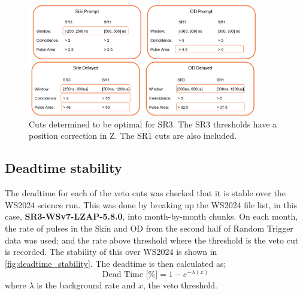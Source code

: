 \begin{figure}
	\centering
	\includegraphics[width=0.9\textwidth]{figures/VetoEfficiency/sr3_cuts.png}
	\caption{Cuts determined to be optimal for SR3.
		The SR3 thresholds have a position correction in Z. The SR1 cuts are also included.}
	\label{fig:sr3_veto_cuts}
\end{figure}

\subsection{Deadtime stability}
The deadtime for each of the veto cuts was checked that it is stable over the WS2024 science run.
This was done by breaking up the WS2024 file list, in this case, \textbf{SR3-WSv7-LZAP-5.8.0}, into month-by-month chunks.
On each month, the rate of pulses in the Skin and OD from the second half of Random Trigger data was used; and the rate above threshold where the threshold is the veto cut is recorded. 
The stability of this over WS2024 is shown in \autoref{fig:deadtime_stability}.
The deadtime is then calculated as;
\begin{equation}
	\textrm{Dead Time [\%]} = 1 - e^{-\lambda (x)}
\end{equation}
where $\lambda$ is the background rate and $x$, the veto threshold.

